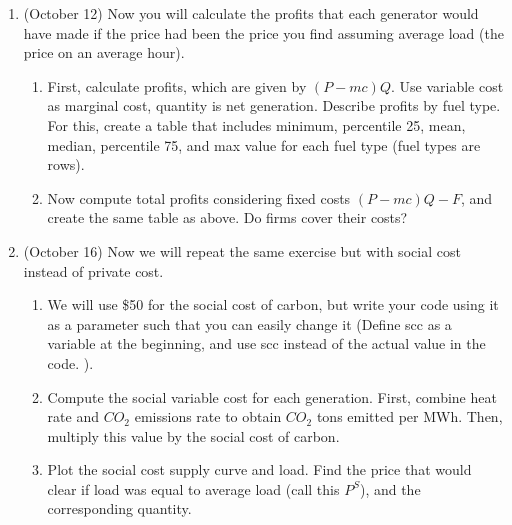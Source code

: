 \documentclass[11pt]{article}
\begin{document}
\begin{enumerate}
\item (October 12) Now you will calculate the profits that each generator would have made if the price had been the price you find assuming average load (the price on an average hour). 
	\begin{enumerate}
	\item First, calculate profits, which are given by $(P-mc)Q$. Use variable cost as marginal cost, quantity is net generation. Describe profits by fuel type. For this, create a table that includes minimum, percentile 25, mean, median, percentile 75, and max value for each fuel type (fuel types are rows).
	\item Now compute total profits considering fixed costs $(P-mc)Q -F$, and create the same table as above. Do firms cover their costs?
	\end{enumerate}
\item (October 16) Now we will repeat the same exercise but with social cost instead of private cost.
	\begin{enumerate}
	\item 	We will use \$50 for the social cost of carbon, but write your code using it as a parameter such that you can easily change it (Define scc as a variable at the beginning, and use scc instead of the actual value in the code.  ). 
	\item Compute the social variable cost for each generation. First, combine heat rate and $CO_2$ emissions rate to obtain $CO_2$ tons emitted per MWh. Then, multiply this value by the social cost of carbon.
	\item Plot the social cost supply curve and load. Find the price that would clear if load was equal to average load (call this $P^S$), and the corresponding quantity. 
	\end{enumerate}
	

\end{enumerate}
\end{document}
